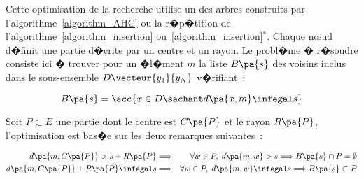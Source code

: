 Cette optimisation de la recherche utilise un des arbres construits par l'algorithme~\ref{algorithm_AHC} ou la r�p�tition de l'algorithme~\ref{algorithm_insertion} ou~\ref{algorithm_insertion}$^*$. Chaque n\oe ud d�finit une partie d�crite par un centre et un rayon. Le probl�me � r�soudre consiste ici � trouver pour un �l�ment $m$ la liste $B\pa{s}$ des voisins inclus dans le sous-ensemble $D\vecteur{y_1}{y_N}$ v�rifiant~:

            $$
            B\pa{s} = \acc{ x \in D \sachant d\pa{x,m} \infegal s }
            $$

Soit $P \subset E$ une partie dont le centre est $C\pa{P}$ et le rayon $R\pa{P}$, l'optimisation est bas�e sur les deux remarques suivantes~:

    \begin{eqnarray}
    d\pa{m,C\pa{P}} > s + R\pa{P}                 &\Longrightarrow& 
                                                                                \forall w \in P, \; d\pa{m,w} > s 
                                                    \Longrightarrow    B\pa{s} \cap P = \emptyset                    \label{equation_un}     \\
    d\pa{m,C\pa{P}} + R\pa{P} \infegal s     &\Longrightarrow& 
                                                                                \forall w \in P, \; d\pa{m,w} \infegal s 
                                                                            \Longrightarrow    B\pa{s} \subset  P \label{equation_deux} 
    \end{eqnarray}




